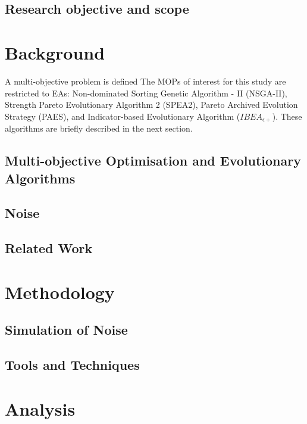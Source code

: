 \documentclass[conference,a4paper]{IEEEtran}
\begin{document}
\subsection{Research objective and scope}\label{sec: oneA}


\section{Background}\label{sec: two}
A multi-objective problem is defined 
The MOPs of interest for this study are restricted to EAs: Non-dominated Sorting Genetic Algorithm - II (NSGA-II), Strength Pareto Evolutionary Algorithm 2 (SPEA2), Pareto Archived Evolution Strategy (PAES), and Indicator-based Evolutionary Algorithm ($IBEA_{\epsilon+}$). These algorithms are briefly described in the next section.

\subsection{Multi-objective Optimisation and Evolutionary Algorithms}\label{sec:twoA}

\subsection{Noise}\label{sec:twoB}

\subsection{Related Work}\label{sec: twoC}

\section{Methodology}\label{sec: three}

\subsection{Simulation of Noise}\label{sec: threeA}

\subsection{Tools and Techniques}\label{sec: threeB}

\section{Analysis}\label{sec: four}
\end{document}
